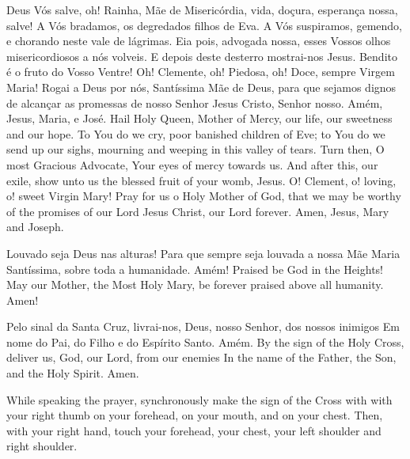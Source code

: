   \beginverse
    Deus Vós salve, oh! Rainha, Mãe de Misericórdia,
    vida, doçura, esperança nossa, salve!
    \ind A Vós bradamos, os degredados filhos de Eva.
    \ind A Vós suspiramos, gemendo, e chorando neste
    vale de lágrimas.
    \ind Eia pois, advogada nossa, esses Vossos olhos
    misericordiosos a nós volveis.
    \ind E depois deste desterro mostrai-nos Jesus.
    \ind Bendito é o fruto do Vosso Ventre!
    \ind Oh! Clemente, oh! Piedosa, oh! Doce, sempre
    Virgem Maria!
    \ind Rogai a Deus por nós, Santíssima Mãe de Deus,
    para que sejamos dignos de alcançar as promessas
    de nosso Senhor Jesus Cristo, Senhor nosso.
    \parspace
    Amém, Jesus, Maria, e José.
  \endverse
  \beginverse
    Hail Holy Queen, Mother of Mercy, our life, our
    sweetness and our hope.
    \ind To You do we cry, poor banished children of Eve;
    \ind to You do we send up our sighs, mourning and
    weeping in this valley of tears.
    \ind Turn then, O most Gracious Advocate, Your eyes
    of mercy towards us.
    \ind And after this, our exile, show unto us the
    blessed fruit of your womb, Jesus.
    \ind O! Clement, o! loving, o! sweet Virgin Mary!
    \ind Pray for us o Holy Mother of God, that we may
    be worthy of the promises of our Lord Jesus Christ,
    our Lord forever.
    \parspace
    Amen, Jesus, Mary and Joseph.
  \endverse
\endsong


  \beginverse
    Louvado seja Deus nas alturas!
    Para que sempre seja louvada
    a nossa Mãe Maria Santíssima,
    sobre toda a humanidade.
    Amém!
  \endverse
  \beginverse
    Praised be God in the Heights!
    May our Mother, the Most Holy Mary,
    be forever praised above all humanity.
    Amen!
  \endverse
\endsong


  \beginverse
    Pelo sinal da Santa Cruz,
    livrai-nos, Deus, nosso Senhor,
    dos nossos inimigos
    \parspace
    Em nome do Pai,
    do Filho e
    do Espírito Santo.
    \parspace
    Amém.
  \endverse
  \beginverse
    By the sign of the Holy Cross,
    deliver us, God, our Lord,
    from our enemies
    \parspace
    In the name of the Father,
    the Son, and
    the Holy Spirit.
    \parspace
    Amen.
  \endverse
  \begin{note}
    While speaking the prayer, synchronously make
    the sign of the Cross with with your right thumb
    on your forehead,
    on your mouth, and
    on your chest.
    \parspace
    Then, with your right hand, touch
    your forehead,
    your chest,
    your left shoulder and right shoulder.
  \end{note}
\endsong
